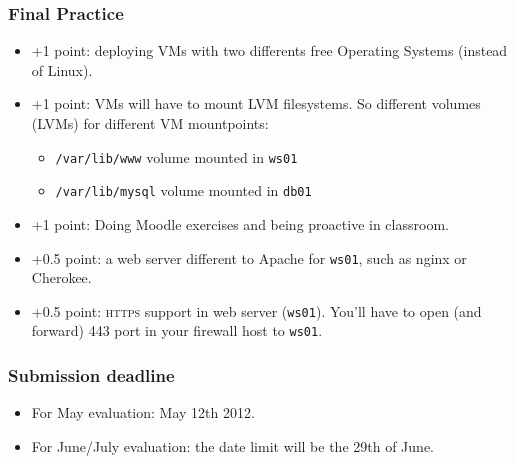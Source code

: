 \documentclass{beamer}
\begin{document}

\begin{frame}
\frametitle{Final Practice}

\begin{itemize}
\item  \alert{+1 point:} deploying VMs with two differents free Operating Systems (instead of Linux).
\item  \alert{+1 point:} VMs will have to mount LVM filesystems. So different volumes (LVMs) for different VM mountpoints:
	\begin{itemize}
	\item \texttt{/var/lib/www} volume mounted in \texttt{ws01}
	\item \texttt{/var/lib/mysql} volume mounted in \texttt{db01}
	\end{itemize}
\item  \alert{+1 point:} Doing Moodle exercises and being proactive in classroom.
\item  \alert{+0.5 point:} a web server different to Apache for \texttt{ws01}, such as nginx or Cherokee.
\item  \alert{+0.5 point:} \textsc{https} support in web server (\texttt{ws01}). You'll have to open (and forward) 443 port in your firewall host to \texttt{ws01}.
\end{itemize}
\end{frame}


\begin{frame}
\frametitle{Submission deadline}

\begin{itemize}
\item For May evaluation: \alert{May 12th 2012}. 
\item For June/July evaluation: the date limit will be the \alert{29th of June}.
\end{itemize}

\end{frame}


\end{document}
